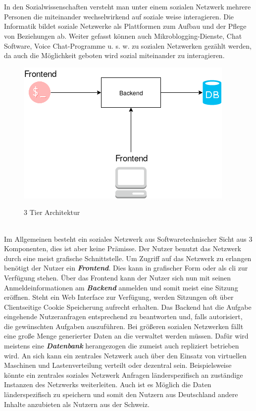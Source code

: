 \section{
}
In den Sozialwissenschaften versteht man unter einem sozialen Netzwerk mehrere Personen die miteinander wechselwirkend auf soziale weise interagieren. Die Informatik bildet soziale Netzwerke als Plattformen zum Aufbau und der Pflege von Beziehungen ab. Weiter gefasst können auch Mikroblogging-Dienste, Chat Software, Voice Chat-Programme u. s. w. zu sozialen Netzwerken gezählt werden, da auch die Möglichkeit geboten wird sozial miteinander zu interagieren\cite{wikipedia-social-network-sociology}.\\
\begin{figure}[h]
	\begin{minipage}{\textwidth}
		\centering
		\includegraphics[scale=0.55]{figures/central-social-network.png}
		\label{fig:central-social-network}
		\caption{3 Tier Architektur}
	\end{minipage}
\end{figure}\\
Im Allgemeinen besteht ein soziales Netzwerk aus Softwaretechnischer Sicht aus 3 Komponenten, dies ist aber keine Prämisse. Der Nutzer benutzt das Netzwerk durch eine meist grafische Schnittstelle. Um Zugriff auf das Netzwerk zu erlangen benötigt der Nutzer ein \textit{\textbf{Frontend}}. Dies kann in grafischer Form oder als \gls{cli} zur Verfügung stehen. Über das Frontend kann der Nutzer sich nun mit seinen Anmeldeinformationen am \textit{\textbf{Backend}} anmelden und somit meist eine Sitzung eröffnen. Steht ein Web Interface zur Verfügung, werden Sitzungen oft über Clientseitige Cookie Speicherung aufrecht erhalten. Das Backend hat die Aufgabe eingehende Nutzeranfragen entsprechend zu beantworten und, falls autorisiert, die gewünschten Aufgaben auszuführen. Bei größeren sozialen Netzwerken fällt eine große Menge generierter Daten an die verwaltet werden müssen. Dafür wird meistens eine \textit{\textbf{Datenbank}} herangezogen die zumeist auch repliziert betrieben wird. An sich kann ein zentrales Netzwerk auch über den Einsatz von virtuellen Maschinen und Lastenverteilung verteilt oder dezentral sein. Beispielsweise könnte ein zentrales soziales Netzwerk Anfragen länderspezifisch an zuständige Instanzen des Netzwerks weiterleiten. Auch ist es Möglich die Daten länderspezifisch zu speichern und somit den Nutzern aus Deutschland andere Inhalte anzubieten als Nutzern aus der Schweiz.
